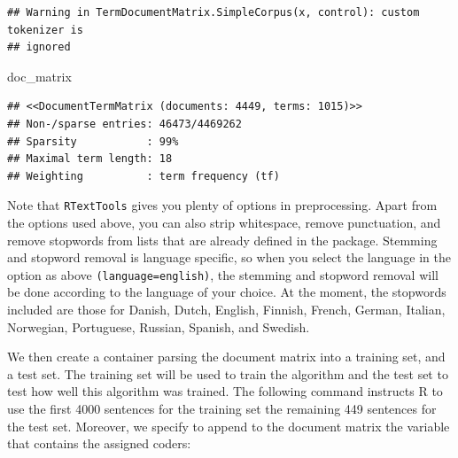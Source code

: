\documentclass[
]{book}
\newenvironment{Shaded}{\begin{snugshade}}{\end{snugshade}}
\newcommand{\AttributeTok}[1]{\textcolor[rgb]{0.77,0.63,0.00}{#1}}
\newcommand{\ConstantTok}[1]{\textcolor[rgb]{0.00,0.00,0.00}{#1}}
\newcommand{\DecValTok}[1]{\textcolor[rgb]{0.00,0.00,0.81}{#1}}
\newcommand{\FunctionTok}[1]{\textcolor[rgb]{0.00,0.00,0.00}{#1}}
\newcommand{\NormalTok}[1]{#1}
\newcommand{\OtherTok}[1]{\textcolor[rgb]{0.56,0.35,0.01}{#1}}
\newcommand{\SpecialCharTok}[1]{\textcolor[rgb]{0.00,0.00,0.00}{#1}}
\begin{document}
\begin{verbatim}
## Warning in TermDocumentMatrix.SimpleCorpus(x, control): custom tokenizer is
## ignored
\end{verbatim}

\begin{Shaded}
\begin{Highlighting}[]
\NormalTok{doc\_matrix}
\end{Highlighting}
\end{Shaded}

\begin{verbatim}
## <<DocumentTermMatrix (documents: 4449, terms: 1015)>>
## Non-/sparse entries: 46473/4469262
## Sparsity           : 99%
## Maximal term length: 18
## Weighting          : term frequency (tf)
\end{verbatim}

Note that \texttt{RTextTools} gives you plenty of options in preprocessing. Apart from the options used above, you can also strip whitespace, remove punctuation, and remove stopwords from lists that are already defined in the package. Stemming and stopword removal is language specific, so when you select the language in the option as above \texttt{(language=\textquotesingle{}\textquotesingle{}english\textquotesingle{}\textquotesingle{})}, the stemming and stopword removal will be done according to the language of your choice. At the moment, the stopwords included are those for Danish, Dutch, English, Finnish, French, German, Italian, Norwegian, Portuguese, Russian, Spanish, and Swedish.

We then create a container parsing the document matrix into a training set, and a test set. The training set will be used to train the algorithm and the test set to test how well this algorithm was trained. The following command instructs R to use the first 4000 sentences for the training set the remaining 449 sentences for the test set. Moreover, we specify to append to the document matrix the variable that contains the assigned coders:

\begin{Shaded}
\end{Shaded}
\end{document}
